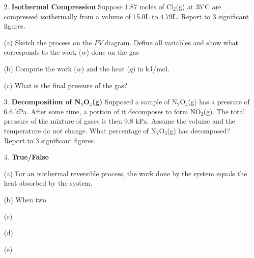 \documentclass[11pt]{article}
\begin{document}
2. \textbf{Isothermal Compression} Suppose 1.87 moles of Cl$_2$(g) at $35^\circ\text{C}$ are
compressed isothermally from a volume of 15.0L to 4.79L. Report to 3 significant figures.

(a) Sketch the process on the $PV$ diagram. Define all variables and show what corresponds
to the work ($w$) done on the gas

(b) Compute the work ($w$) and the heat ($q$) in kJ/mol.

(c) What is the final pressure of the gas?

3. \textbf{Decomposition of N$_2$O$_4$(g)} Supposed a sample of N$_2$O$_4$(g) has
a pressure of 6.6 kPa. After some time, a portion of it decomposes to form NO$_2$(g).
The total pressure of the mixture of gases is then 9.8 kPa. Assume the volume and the
temperature do not change. What percentage of N$_2$O$_4$(g) has decomposed? Report to
3 significant figures.

4. \textbf{True/False}

(a) For an isothermal reversible process, the work done by the system equals the heat
absorbed by the system.

(b) When two 

(c)

(d)

(e)

\pagebreak
\end{document}
